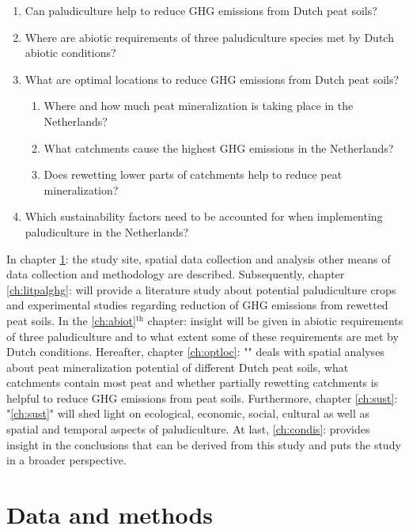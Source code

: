 \documentclass[a4paper,12pt]{scrbook}
\newcommand{\sur}[1]{\ensuremath{^{\textrm{#1}}}}
\begin{document}
\begin{enumerate}
\item \label{rq:pallit} {Can paludiculture help to reduce GHG emissions from Dutch peat soils?} 
\item \label{rq:abiot} {Where are abiotic requirements of three paludiculture species met by Dutch abiotic conditions?}
\item \label{rq:gisoptloc} {What are optimal locations to reduce GHG emissions from Dutch peat soils?}
\begin{enumerate}
\item \label{rqsub:peatmineral} {Where and how much peat mineralization is taking place in the Netherlands?}
\item \label{rqsub:catchpeat} {What catchments cause the highest GHG emissions in the Netherlands?}
\item \label{rqsub:catchheigth} {Does rewetting lower parts of catchments help to reduce peat mineralization?}
\end{enumerate}
\label{rq:sust}\item{Which sustainability factors need to be accounted for when implementing paludiculture in the Netherlands?}
\end{enumerate}

In chapter \ref{ch:datamethods}:  the study site, spatial data collection and analysis other means of data collection and methodology are described. Subsequently, chapter \ref{ch:litpalghg}:  will provide a literature study about potential paludiculture crops and experimental studies regarding reduction of GHG emissions from rewetted peat soils. In the \ref{ch:abiot}\sur{th} chapter:  insight will be given in abiotic requirements of three paludiculture and to what extent some of these requirements are met by Dutch conditions. Hereafter, chapter \ref{ch:optloc}: "" deals with spatial analyses about peat mineralization potential of different Dutch peat soils, what catchments contain most peat and whether partially rewetting catchments is helpful to reduce GHG emissions from peat soils. Furthermore, chapter \ref{ch:sust}: "\ref{ch:sust}" will shed light on ecological, economic, social, cultural as well as spatial and temporal aspects of paludiculture. At last, \ref{ch:condis}:  provides insight in the conclusions that can be derived from this study and puts the study in a broader perspective.

\chapter{Data and methods} \label{ch:datamethods}
\end{document}
